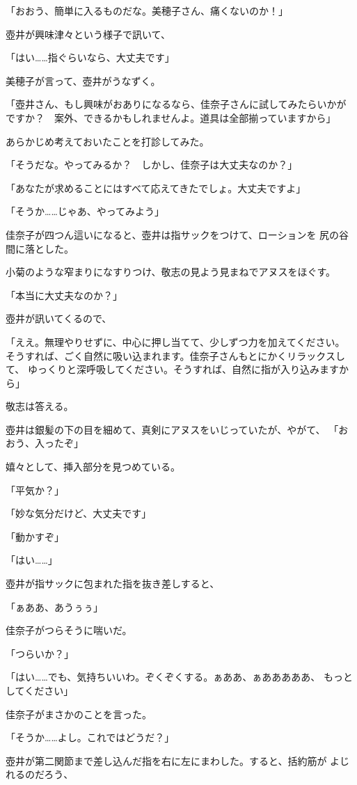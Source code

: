 ﻿\documentclass[
    book,tate,
    line_length=30zw,
    jafontsize=12pt,
    paper=b5j,
    landscape,
    ]{jlreq}
\begin{document}
「おおう、簡単に入るものだな。美穂子さん、痛くないのか！」

壺井が興味津々という様子で訊いて、

「はい……指ぐらいなら、大丈夫です」

美穂子が言って、壺井がうなずく。

「壺井さん、もし興味がおありになるなら、佳奈子さんに試してみたらいかが
ですか？　案外、できるかもしれませんよ。道具は全部揃っていますから」

あらかじめ考えておいたことを打診してみた。

「そうだな。やってみるか？　しかし、佳奈子は大丈夫なのか？」

「あなたが求めることにはすべて応えてきたでしょ。大丈夫ですよ」

「そうか……じゃあ、やってみよう」

佳奈子が四つん這いになると、壺井は指サックをつけて、ローションを
尻の谷間に落とした。

小菊のような窄まりになすりつけ、敬志の見よう見まねでアヌスをほぐす。

「本当に大丈夫なのか？」

壺井が訊いてくるので、

「ええ。無理やりせずに、中心に押し当てて、少しずつ力を加えてください。
そうすれば、ごく自然に吸い込まれます。佳奈子さんもとにかくリラックスして、
ゆっくりと深呼吸してください。そうすれば、自然に指が入り込みますから」

敬志は答える。

壺井は銀髪の下の目を細めて、真剣にアヌスをいじっていたが、やがて、
「おおう、入ったぞ」

嬉々として、挿入部分を見つめている。

「平気か？」

「妙な気分だけど、大丈夫です」

「動かすぞ」

「はい……」

壺井が指サックに包まれた指を抜き差しすると、

「ぁああ、あうぅぅ」

佳奈子がつらそうに喘いだ。

「つらいか？」

「はい……でも、気持ちいいわ。ぞくぞくする。ぁああ、ぁあああああ、
もっとしてください」

佳奈子がまさかのことを言った。

「そうか……よし。これではどうだ？」

壺井が第二関節まで差し込んだ指を右に左にまわした。すると、括約筋が
よじれるのだろう、
\end{document}
